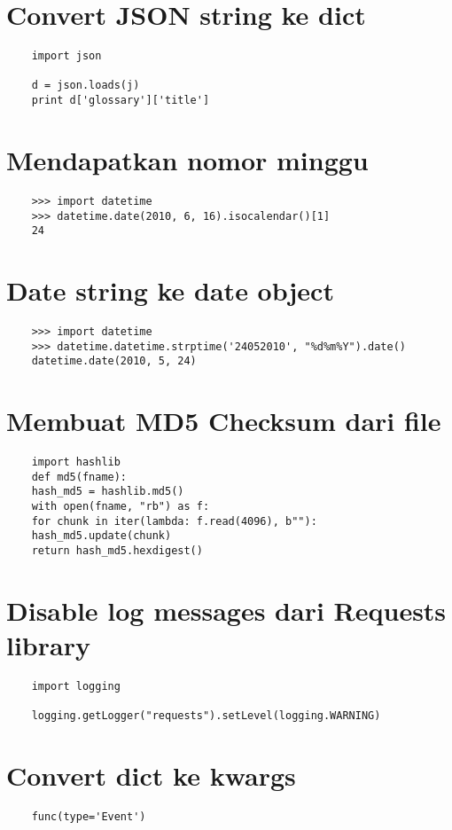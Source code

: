 \documentclass{article}
\begin{document}
\section {Convert JSON string ke dict}
\begin{lstlisting}
	import json
	
	d = json.loads(j)
	print d['glossary']['title']
\end{lstlisting}

\section {Mendapatkan nomor minggu}
\begin{lstlisting}
	>>> import datetime
	>>> datetime.date(2010, 6, 16).isocalendar()[1]
	24
\end{lstlisting}

\section {Date string ke date object}
\begin{lstlisting}
	>>> import datetime
	>>> datetime.datetime.strptime('24052010', "%d%m%Y").date()
	datetime.date(2010, 5, 24)
\end{lstlisting}

\section {Membuat MD5 Checksum dari file}
\begin{lstlisting}
	import hashlib
	def md5(fname):
	hash_md5 = hashlib.md5()
	with open(fname, "rb") as f:
	for chunk in iter(lambda: f.read(4096), b""):
	hash_md5.update(chunk)
	return hash_md5.hexdigest()
\end{lstlisting}

\section {Disable log messages dari Requests library}
\begin{lstlisting}
	import logging
	
	logging.getLogger("requests").setLevel(logging.WARNING)
\end{lstlisting}

\section {Convert dict ke kwargs}
\begin{lstlisting}
	func(type='Event')
\end{lstlisting}
\end{document}
